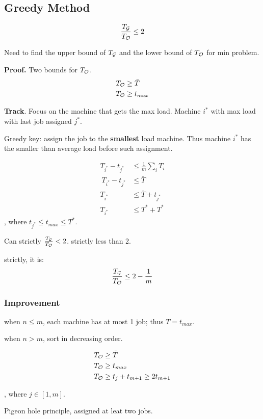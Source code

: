 \documentclass[a4paper]{report}
\theoremstyle{definition}
\begin{document}
\subsection{Greedy Method}
$$
\frac{T_{\mathcal{G}}}{T_{\mathcal{O}}} \leq 2
$$

Need to find the upper bound of $T_{\mathcal{G}}$ and the lower bound of $T_{\mathcal{O}}$ for min problem. 

\textbf{Proof.} Two bounds for $T_{\mathcal{O}}$. 
\begin{align*}
T_{\mathcal{O}} &\geq \bar T \\
T_{\mathcal{O}} &\geq t_{max}
\end{align*}

\textbf{Track}. Focus on the machine that gets the max load. Machine $i^*$ with max load with last job assigned $j^*$. 

Greedy key: assign the job to the \textbf{smallest} load machine. Thus machine $i^*$ has the smaller than average load before such assignment. 

\begin{align*}
T_{i^*} - t_{j^*} &\leq \frac{1}{m} \sum_{i} T_i\\\
T_{i^*} - t_{j^*} &\leq \bar T \\
T_{i^*} &\leq \bar T + t_{j^*}\\
T_{i^*} &\leq T^* +T^*
\end{align*}
, where $t_{j^*}\leq t_{max}\leq T^*$. 

Can strictly $\frac{T_{\mathcal{G}}}{T_{\mathcal{O}}}<2$. strictly less than 2. 

strictly, it is:
$$
\frac{T_{\mathcal{G}}}{T_{\mathcal{O}}} \leq 2-\frac{1}{m}
$$

\subsubsection{Improvement}
when $n\leq m$, each machine has at most 1 job; thus $T=t_{max}$. 

when $n>m$, sort in decreasing order. 

\begin{align*}
& T_{\mathcal{O}} \geq \bar T \\
& T_{\mathcal{O}} \geq t_{max} \\
& T_{\mathcal{O}} \geq t_j + t_{m+1} \geq 2t_{m+1} \\ 
\end{align*}

, where $j\in[1, m]$.

Pigeon hole principle, assigned at leat two jobs.
\end{document}
